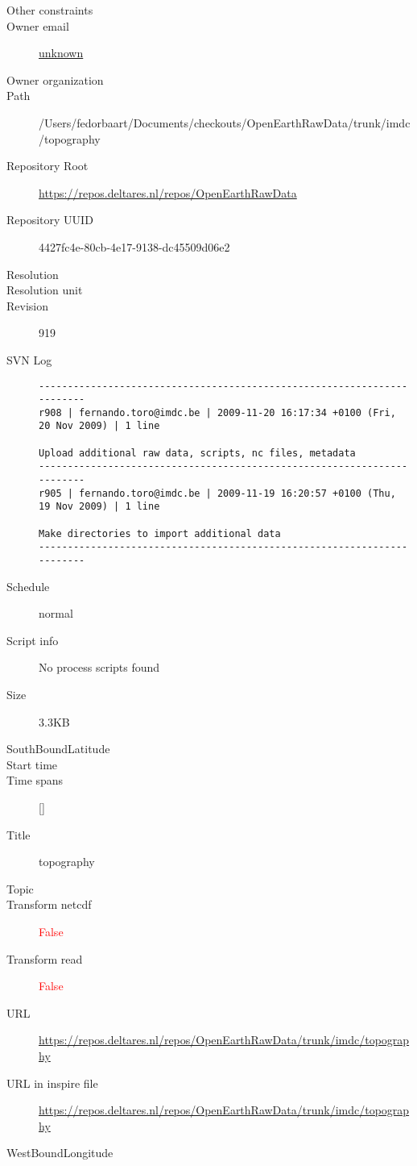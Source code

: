 \documentclass[9]{report}
\begin{document}
\begin{description}
  \item[Other constraints] 
  \item[Owner email] \href{mailto:unknown}{unknown}
  \item[Owner organization] 
  \item[Path] /Users/fedorbaart/Documents/checkouts/OpenEarthRawData/trunk/imdc/topography
  \item[Repository Root] \href{https://repos.deltares.nl/repos/OpenEarthRawData}{https://repos.deltares.nl/repos/OpenEarthRawData}
  \item[Repository UUID] 4427fc4e-80cb-4e17-9138-dc45509d06e2
  \item[Resolution] 
  \item[Resolution unit] 
  \item[Revision] 919
  \item[SVN Log] \begin{verbatim}
------------------------------------------------------------------------
r908 | fernando.toro@imdc.be | 2009-11-20 16:17:34 +0100 (Fri, 20 Nov 2009) | 1 line

Upload additional raw data, scripts, nc files, metadata
------------------------------------------------------------------------
r905 | fernando.toro@imdc.be | 2009-11-19 16:20:57 +0100 (Thu, 19 Nov 2009) | 1 line

Make directories to import additional data
------------------------------------------------------------------------

\end{verbatim}
  \item[Schedule] normal
  \item[Script info] No process scripts found
  \item[Size] 3.3KB
  \item[SouthBoundLatitude] 
  \item[Start time] 
  \item[Time spans] []
  \item[Title]  topography 
  \item[Topic] 
  \item[Transform netcdf] \textcolor{red}{False}
  \item[Transform read] \textcolor{red}{False}
  \item[URL] \href{https://repos.deltares.nl/repos/OpenEarthRawData/trunk/imdc/topography}{https://repos.deltares.nl/repos/OpenEarthRawData/trunk/imdc/topography}
  \item[URL in inspire file] \href{https://repos.deltares.nl/repos/OpenEarthRawData/trunk/imdc/topography}{https://repos.deltares.nl/repos/OpenEarthRawData/trunk/imdc/topography}
  \item[WestBoundLongitude] 
\end{description}
\end{document}
